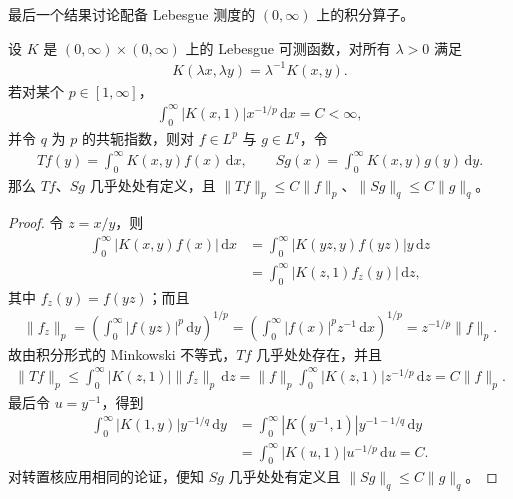 \documentclass[../../main.tex]{subfiles}
\begin{document}
最后一个结果讨论配备 Lebesgue 测度的 $(0,\infty)$ 上的积分算子。
\begin{theorem}\label{theorem:ch06-homogeneous-kernel}
设 $K$ 是 $(0,\infty)\times(0,\infty)$ 上的 Lebesgue 可测函数，对所有 $\lambda>0$ 满足
\begin{align*}
K(\lambda x,\lambda y)=\lambda^{-1}K(x,y).
\end{align*}
若对某个 $p\in[1,\infty]$，
\begin{align*}
\int_0^\infty|K(x,1)|x^{-1/p}\,\mathrm dx=C<\infty,
\end{align*}
并令 $q$ 为 $p$ 的共轭指数，则对 $f\in L^p$ 与 $g\in L^q$，令
\begin{align*}
Tf(y)=\int_0^\infty K(x,y)f(x)\,\mathrm dx,
\qquad Sg(x)=\int_0^\infty K(x,y)g(y)\,\mathrm dy.
\end{align*}
那么 $Tf$、$Sg$ 几乎处处有定义，且 $\|Tf\|_p\leqslant C\|f\|_p$、$\|Sg\|_q\leqslant C\|g\|_q$。
\end{theorem}
\begin{proof}
令 $z=x/y$，则
\begin{align*}
\int_0^\infty|K(x,y)f(x)|\,\mathrm dx
&=\int_0^\infty|K(yz,y)f(yz)|y\,\mathrm dz\\
&=\int_0^\infty|K(z,1)f_z(y)|\,\mathrm dz,
\end{align*}
其中 $f_z(y)=f(yz)$；而且
\begin{align*}
\|f_z\|_p
=\left(\int_0^\infty|f(yz)|^p\,\mathrm dy\right)^{1/p}
=\left(\int_0^\infty|f(x)|^pz^{-1}\,\mathrm dx\right)^{1/p}
=z^{-1/p}\|f\|_p.
\end{align*}
故由积分形式的 Minkowski 不等式，$Tf$ 几乎处处存在，并且
\begin{align*}
\|Tf\|_p\leqslant\int_0^\infty|K(z,1)|\|f_z\|_p\,\mathrm dz
=\|f\|_p\int_0^\infty|K(z,1)|z^{-1/p}\,\mathrm dz=C\|f\|_p.
\end{align*}
最后令 $u=y^{-1}$，得到
\begin{align*}
\int_0^\infty|K(1,y)|y^{-1/q}\,\mathrm dy
&=\int_0^\infty|K(y^{-1},1)|y^{-1-1/q}\,\mathrm dy\\
&=\int_0^\infty|K(u,1)|u^{-1/p}\,\mathrm du=C.
\end{align*}
对转置核应用相同的论证，便知 $Sg$ 几乎处处有定义且 $\|Sg\|_q\leqslant C\|g\|_q$。
\end{proof}
\end{document}
